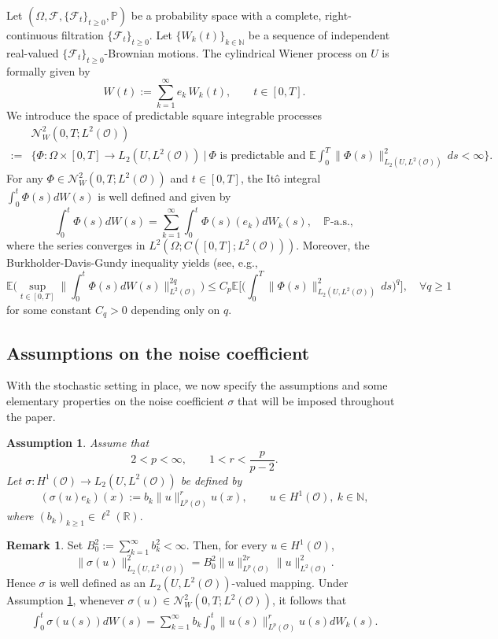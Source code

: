 \documentclass[reqno, 11pt]{amsart}
\newtheorem{assumption}{Assumption}
\theoremstyle{definition}
\numberwithin{equation}{section} \numberwithin{lem}{section}
\numberwithin{thm}{section} \numberwithin{prop}{section}
\numberwithin{cor}{section} \numberwithin{rem}{section}
\numberwithin{defn}{section}
\newtheorem{remark}{Remark}[section]
\begin{document}
 Let   $(\Omega,\mathcal F,\{\mathcal F_t\}_{t\ge0},\mathbb P)$ be a probability space  with a complete, right-continuous filtration $\{\mathcal F_t\}_{t\ge0}$. Let $\{W_k(t)\}_{k\in\mathbb N}$  be a sequence of independent real-valued $\{\mathcal F_t\}_{t\ge 0}$-Brownian motions. The cylindrical Wiener process on $U$ is formally given by
	\[
	W(t):=\sum_{k=1}^\infty e_k\,W_k(t),\qquad t\in[0,T].
	\]
	We introduce the space of predictable square integrable processes
    \begin{align*}
        &\mathcal N_W^2(0,T;{L^2(\mathcal {O})})\\
	:=&\Big\{\Phi:\Omega\times[0,T]\to L_2(U,{L^2(\mathcal {O})})\ \Big|\ 
	\Phi \text{ is predictable and }
\mathbb E\int_0^T \|\Phi(s)\|_{L_2(U,L^2(\mathcal O))}^2\,ds<\infty
	\Big\}.
    \end{align*}
	For any $\Phi\in\mathcal N_W^2(0,T;{L^2(\mathcal {O})})$ and $t\in[0,T]$, the It\^o integral $\displaystyle\int_0^t \Phi(s)dW(s)$ is well defined and given by
	\[
	\int_0^t \Phi(s)dW(s)
	=\sum_{k=1}^\infty \int_0^t \Phi(s)(e_k)dW_k(s),
	\quad \mathbb P\text{-a.s.},
	\]
	where the series converges in $L^2(\Omega;C([0,T];{L^2(\mathcal {O})}))$. Moreover, the Burkholder-Davis-Gundy inequality yields (see, e.g., \cite[Lemma 3.1]{gawarecki2010stochastic}
	\begin{equation}\label{BDG}
		\mathbb E\Big(\sup_{t\in[0,T]}\Big\|\int_0^t \Phi(s)dW(s)\Big\|_{L^2(\mathcal {O})}^{2q}\Big)
		\le C_p\mathbb E\Big[\Big(\int_0^T \|\Phi(s)\|_{L_2(U,{L^2(\mathcal {O})})}^2\,ds\Big)^q\Big],\quad\forall q\ge1
	\end{equation}
	for some constant $C_q>0$ depending only on $q$. 
	
 \subsection{Assumptions on the noise coefficient} With the stochastic setting in place, we now specify the assumptions and  some elementary properties on the noise coefficient $\sigma$ that will be imposed throughout the paper.

\begin{assumption}\label{ass}
Assume that
\[
2< p<\infty,
\qquad
1<r<\frac{p}{p-2}.
\]
Let $\sigma:H^1(\mathcal O)\to L_2(U,L^2(\mathcal O))$
be defined by
\[
(\sigma(u)e_k)(x):=b_k\|u\|_{L^p(\mathcal O)}^{r}u(x),
\qquad u\in H^1(\mathcal O),\ k\in\mathbb N,
\]
where $(b_k)_{k\ge1}\in \ell^2(\mathbb R).$
\end{assumption}
\begin{remark}
Set $B_0^2:=\sum_{k=1}^\infty b_k^2<\infty.$
Then, for every $u\in H^1(\mathcal O)$,
\[
\|\sigma(u)\|_{L_2(U,L^2(\mathcal O))}^2
=
B_0^2\|u\|_{L^p(\mathcal O)}^{2r}\|u\|_{L^2(\mathcal O)}^2.
\]
Hence $\sigma$ is well defined as an $L_2(U,L^2(\mathcal O))$-valued mapping. Under Assumption \ref{ass}, whenever $\sigma(u)\in \mathcal N_W^2(0,T;L^2(\mathcal O))$,  it follows that 
\begin{align*}
    \int_0^t\sigma(u(s))dW(s)=\sum_{k=1}^\infty b_k\int_0^t\|u(s)\|_{L^p(\mathcal O)}^{r}u(s)dW_k(s).
\end{align*}
\end{remark}
\end{document}
